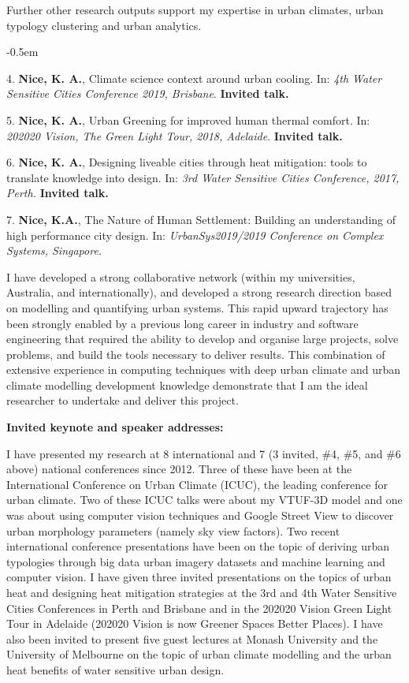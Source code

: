 Further other research outputs support my expertise in urban climates, urban typology clustering and urban analytics.
\begin{list}{}{}
\itemsep-0.5em
\item [4.] \textbf{Nice, K. A.}, Climate science context around urban cooling. In: \textit{4th Water Sensitive Cities Conference 2019, Brisbane}. \textbf{Invited talk.}
\item [5.] \textbf{Nice, K. A.}, Urban Greening for improved human thermal comfort. In: \textit{202020 Vision, The Green Light Tour, 2018, Adelaide}. \textbf{Invited talk.}
\item [6.] \textbf{Nice, K. A.}, Designing liveable cities through heat mitigation: tools to translate knowledge into design. In: \textit{3rd Water Sensitive Cities Conference, 2017, Perth.} \textbf{Invited talk.}
\item [7.] \textbf{Nice, K.A.}, The Nature of Human Settlement: Building an understanding of high performance city design. In: \textit{UrbanSys2019/2019 Conference on Complex Systems, Singapore.}
\end{list}

I have developed a strong collaborative network (within my universities, Australia, and internationally), and developed a strong research direction based on modelling and quantifying urban systems. This rapid upward trajectory has been strongly enabled by a previous long career in industry and software engineering that required the ability to develop and organise large projects, solve problems, and build the tools necessary to deliver results. This combination of extensive experience in computing techniques with deep urban climate and urban climate modelling development knowledge demonstrate that I am the ideal researcher to undertake and deliver this project.


\textbf{Invited keynote and speaker addresses:}

I have presented my research at 8 international and 7 (3 invited, \#4, \#5, and \#6 above) national conferences since 2012. Three of these have been at the International Conference on Urban Climate (ICUC), the leading conference for urban climate. Two of these ICUC talks were about my VTUF-3D model and one was about using computer vision techniques and Google Street View to discover urban morphology parameters (namely sky view factors). Two recent international conference presentations have been on the topic of deriving urban typologies through big data urban imagery datasets and machine learning and computer vision. I have given three invited presentations on the topics of urban heat and designing heat mitigation strategies at the 3rd and 4th Water Sensitive Cities Conferences in Perth and Brisbane and in the 202020 Vision Green Light Tour in Adelaide (202020 Vision is now Greener Spaces Better Places). I have also been invited to present five guest lectures at Monash University and the University of Melbourne on the topic of urban climate modelling and the urban heat benefits of water sensitive urban design. 

